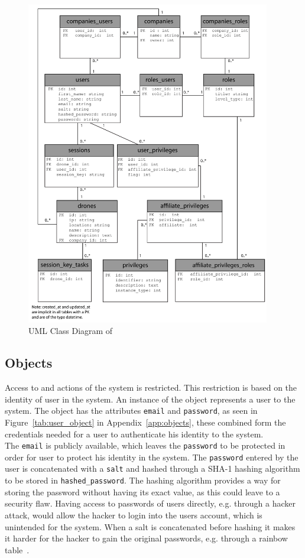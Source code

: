 \begin{figure}[htb]
    \centering
    \includegraphics[width=0.95\textwidth]{gfx/UML_model.pdf}
    \caption{UML Class Diagram of \projectname{}}
    \label{fig:UML_class_diagram}
\end{figure}


\subsection{Objects}
Access to and actions of the system is restricted.
This restriction is based on the identity of user in the system.
An instance of the  object represents a user to the system.
The  object has the attributes \verb+email+ and \verb+password+, as seen in Figure~\ref{tab:user_object} in Appendix~\ref{app:objects}, these combined form the credentials needed for a user to authenticate his identity to the system. \\

The \verb+email+ is publicly available, which leaves the \verb+password+ to be protected in order for user to protect his identity in the system.
The \verb+password+ entered by the user is concatenated with a \verb+salt+ and hashed through a SHA-1 hashing algorithm to be stored in \verb+hashed_password+.
The hashing algorithm provides a way for storing the password without having its exact value, as this could leave to a security flaw.
Having access to passwords of users directly, e.g. through a hacker attack, would allow the hacker to login into the users account, which is unintended for the system.
When a salt is concatenated before hashing it makes it harder for the hacker to gain the original passwords, e.g. through a rainbow table~\cite{something}. \\

